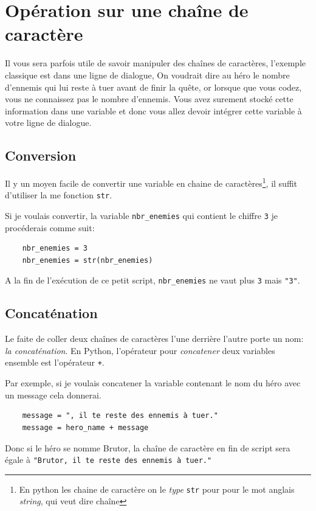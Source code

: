 \documentclass[12pt,a4paper]{report}
\newcommand{\codeintext}[1]{\texttt{#1}}
\begin{document}
\section{Opération sur une chaîne de caractère}

Il vous sera parfois utile de savoir manipuler des chaînes de caractères, l'exemple classique est dans une ligne de dialogue, On voudrait dire au héro le nombre d'ennemis qui lui reste à tuer avant de finir la quête, or lorsque que vous codez, vous ne connaissez pas le nombre d'ennemis. Vous avez surement stocké cette information dans une variable et donc vous allez devoir intégrer cette variable à votre ligne de dialogue.

\subsection{Conversion}
Il y un moyen facile de convertir une variable en chaine de caractères\footnote{En python les chaine de caractère on le \emph{type} \codeintext{str} pour pour le mot anglais \textit{string}, qui veut dire chaîne}, il suffit d'utiliser la me fonction \codeintext{str}.

Si je voulais convertir, la variable \codeintext{nbr\_enemies} qui contient le chiffre \codeintext{3} je procéderais comme suit:

\begin{lstlisting}
	nbr_enemies = 3
	nbr_enemies = str(nbr_enemies)
\end{lstlisting}

A la fin de l'exécution de ce petit script, \codeintext{nbr\_enemies} ne vaut plus \codeintext{3} mais \codeintext{"3"}.

\subsection{Concaténation}
Le faite de coller deux chaînes de caractères l'une derrière l'autre porte un nom: \emph{la concaténation}.
En Python, l'opérateur pour \emph{concatener} deux variables ensemble est l'opérateur \codeintext{+}.

Par exemple, si je voulais concatener la variable contenant le nom du héro avec un message cela donnerai.
 
\begin{lstlisting}
	message = ", il te reste des ennemis à tuer."
	message = hero_name + message
\end{lstlisting}

Donc si le héro se nomme Brutor, la chaîne de caractère en fin de script sera égale à \codeintext{"Brutor, il te reste des ennemis à tuer."}
\end{document}
